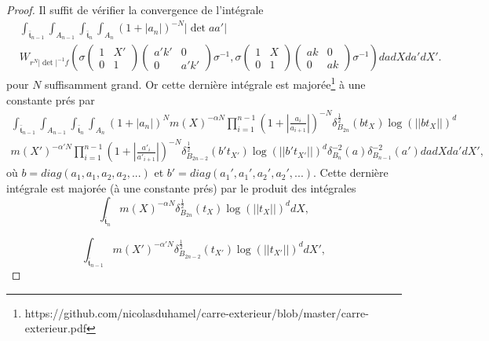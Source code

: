 \documentclass{amsart}
\begin{document}
\begin{proof}
Il suffit de vérifier la convergence de l'intégrale
\begin{equation}
\begin{split}
&\int_{\bar{\mathfrak{t}}_{n-1}} \int_{A_{n-1}} \int_{\bar{\mathfrak{t}}_n} \int_{A_n} (1+|a_n|)^{-N} |\det aa'| \\
& W_{r^N |\det|^{-1}f}\left(\sigma \begin{pmatrix}
1 & X' \\
0 & 1
\end{pmatrix} \begin{pmatrix}
a'k' & 0 \\
0 & a'k'
\end{pmatrix} \sigma^{-1}, \sigma \begin{pmatrix}
1 & X \\
0 & 1
\end{pmatrix} \begin{pmatrix}
ak & 0 \\
0 & ak
\end{pmatrix} \sigma^{-1}\right) da dX da' dX'.
\end{split}
\end{equation}
pour $N$ suffisamment grand. Or cette dernière intégrale est majorée\footnote{https://github.com/nicolasduhamel/carre-exterieur/blob/master/carre-exterieur.pdf} à une constante prés par
\begin{equation}
\begin{split}
\int_{\bar{\mathfrak{t}}_{n-1}} \int_{A_{n-1}} \int_{\bar{\mathfrak{t}}_n} \int_{A_n} (1+|a_n|)^N m(X)^{-\alpha N} \prod_{i=1}^{n-1} (1 + |\frac{a_i}{a_{i+1}}|)^{-N} \delta^{\frac{1}{2}}_{B_{2n}}(bt_X)\log(||bt_X||)^d \\
m(X')^{-\alpha' N} \prod_{i=1}^{n-1} (1 + |\frac{a'_i}{a'_{i+1}}|)^{-N} \delta^{\frac{1}{2}}_{B_{2n-2}}(b't_{X'})\log(||b't_{X'}||)^d \delta_{B_n}^{-2}(a) \delta_{B_{n-1}}^{-2}(a') da dX da' dX',
\end{split}
\end{equation}
où $b = diag(a_1, a_1, a_2, a_2, ...)$ et $b' = diag(a_1', a_1', a_2', a_2', ...)$. Cette dernière intégrale est majorée (à une constante prés) par le produit des intégrales
 \begin{equation}
 \int_{\bar{\mathfrak{t}}_n} m(X)^{-\alpha N} \delta^{\frac{1}{2}}_{B_{2n}}(t_X)\log(||t_X||)^d dX,
 \end{equation}
 
 \begin{equation}
 \int_{\bar{\mathfrak{t}}_{n-1}} m(X')^{-\alpha' N} \delta^{\frac{1}{2}}_{B_{2n-2}}(t_{X'})\log(||t_{X'}||)^d dX',
 \end{equation}
 

\end{proof}
\end{document}
